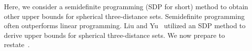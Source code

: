 \documentclass[12pt]{article}
\newtheorem{lem}[thm]{Lemma}
\theoremstyle{remark}
\newcommand{\RR}{\mathbb{R}}
\begin{document}


Here, we consider a semidefinite programming (SDP for short) method to 
obtain other upper bounds for spherical three-distance sets. 
Semidefinite programming often outperforms linear programming.
Liu and Yu~\cite{Liu24} utilized an SDP method to derive upper bounds 
for spherical three-distance sets.
We now prepare to restate~\cite[Theorem~5]{Liu24}. 
\end{document}
